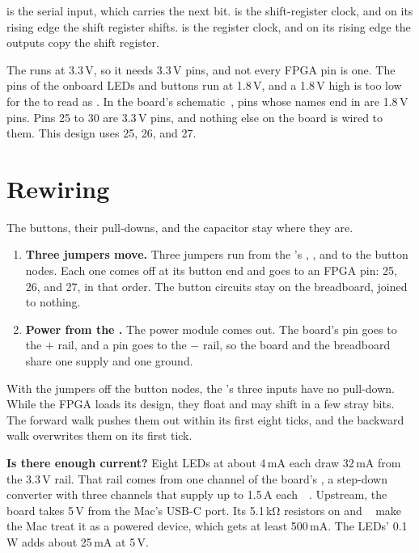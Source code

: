 \documentclass[11pt,a4paper]{article}
\begin{document}
 is the serial input, which carries the next bit.  is the shift-register clock, and on its rising edge the shift register shifts.  is the register clock, and on its rising edge the outputs copy the shift register.

The  runs at 3.3\,V, so it needs 3.3\,V pins, and not every FPGA pin is one. The pins of the onboard LEDs and buttons run at 1.8\,V, and a 1.8\,V high is too low for the  to read as . In the board’s schematic~\cite{schematic}, pins whose names end in  are 1.8\,V pins. Pins 25 to 30 are 3.3\,V pins, and nothing else on the board is wired to them. This design uses 25, 26, and 27.

\section*{Rewiring}

The buttons, their pull-downs, and the  capacitor stay where they are.
\begin{enumerate}
  \item \textbf{Three jumpers move.} Three jumpers run from the ’s , , and  to the button nodes. Each one comes off at its button end and goes to an FPGA pin: 25, 26, and 27, in that order. The button circuits stay on the breadboard, joined to nothing.
  \item \textbf{Power from the .} The power module comes out. The board’s  pin goes to the $+$ rail, and a  pin goes to the $-$ rail, so the board and the breadboard share one supply and one ground.
\end{enumerate}

With the jumpers off the button nodes, the ’s three inputs have no pull-down. While the FPGA loads its design, they float and may shift in a few stray bits. The forward walk pushes them out within its first eight ticks, and the backward walk overwrites them on its first tick.

\textbf{Is there enough current?} Eight LEDs at about 4\,mA each draw 32\,mA from the 3.3\,V rail. That rail comes from one channel of the board’s , a step-down converter with three channels that supply up to 1.5\,A each~\cite{tmi7003c}~\cite[p.~3]{schematic}. Upstream, the board takes 5\,V from the Mac’s USB-C port. Its 5.1\,kΩ resistors on  and ~\cite[p.~4]{schematic} make the Mac treat it as a powered device, which gets at least 500\,mA. The LEDs’ 0.1\,W adds about 25\,mA at 5\,V.
\end{document}
